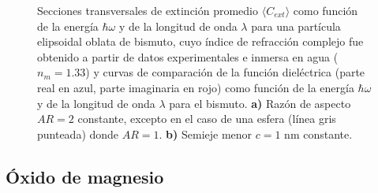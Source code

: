 \begin{figure}[H]
	\quad%
	\caption{Secciones transversales de extinción promedio $\langle C_{ext}\rangle$ como función de la energía $\hbar\omega$ y de la longitud de onda $\lambda$ para una partícula elipsoidal oblata de bismuto, cuyo índice de refracción complejo fue obtenido a partir de datos experimentales  e inmersa en agua ($n_m=1.33$) y curvas de comparación de la función dieléctrica (parte real en azul, parte imaginaria en rojo) como función de la energía $\hbar\omega$ y de la longitud de onda $\lambda$ para el bismuto. \textbf{a)} Razón de aspecto $AR=2$ constante, excepto en el caso de una esfera (línea gris punteada) donde $AR=1$. \textbf{b)} Semieje menor $c=1$ nm constante.}\label{bismuto}
\end{figure}


\subsection*{Óxido de magnesio}

